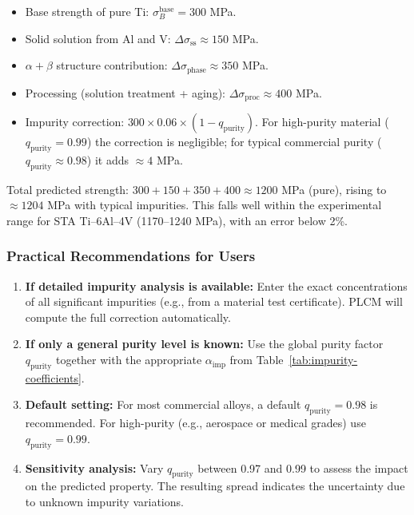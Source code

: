 \documentclass[12pt,a4paper]{article}
\begin{document}
	\begin{itemize}
		\item Base strength of pure Ti: \(\sigma_B^{\mathrm{base}} = 300\) MPa.
		\item Solid solution from Al and V: \(\Delta\sigma_{\mathrm{ss}} \approx 150\) MPa.
		\item \(\alpha+\beta\) structure contribution: \(\Delta\sigma_{\mathrm{phase}} \approx 350\) MPa.
		\item Processing (solution treatment + aging): \(\Delta\sigma_{\mathrm{proc}} \approx 400\) MPa.
		\item Impurity correction: \(300 \times 0.06 \times (1 - q_{\mathrm{purity}})\). For high-purity material (\(q_{\mathrm{purity}}=0.99\)) the correction is negligible; for typical commercial purity (\(q_{\mathrm{purity}}\approx 0.98\)) it adds \(\approx 4\) MPa.
	\end{itemize}
	
	Total predicted strength: \(300+150+350+400 \approx 1200\) MPa (pure), rising to \(\approx 1204\) MPa with typical impurities. This falls well within the experimental range for STA Ti--6Al--4V (1170--1240 MPa), with an error below 2\%.
	
	\subsubsection*{Practical Recommendations for Users}
	
	\begin{enumerate}
		\item \textbf{If detailed impurity analysis is available:} Enter the exact concentrations of all significant impurities (e.g., from a material test certificate). PLCM will compute the full correction automatically.
		\item \textbf{If only a general purity level is known:} Use the global purity factor \(q_{\mathrm{purity}}\) together with the appropriate \(\alpha_{\mathrm{imp}}\) from Table~\ref{tab:impurity-coefficients}.
		\item \textbf{Default setting:} For most commercial alloys, a default \(q_{\mathrm{purity}} = 0.98\) is recommended. For high-purity (e.g., aerospace or medical grades) use \(q_{\mathrm{purity}} = 0.99\).
		\item \textbf{Sensitivity analysis:} Vary \(q_{\mathrm{purity}}\) between 0.97 and 0.99 to assess the impact on the predicted property. The resulting spread indicates the uncertainty due to unknown impurity variations.
	\end{enumerate}
	
\end{document}
